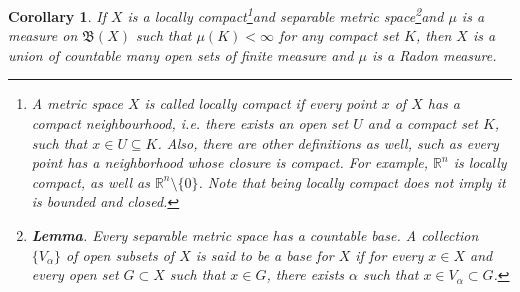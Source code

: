 \documentclass[11pt]{book}
\newtheorem{corollary}{Corollary}[theorem]
\theoremstyle{definition}
\numberwithin{equation}{chapter}
\begin{document}
\begin{corollary}
If $X$ is a locally compact\footnote{A metric space $X$ is called {\em locally compact} if every point $x$ of $X$ has a compact neighbourhood, i.e. there exists an open set $U$ and a compact set $K$, such that $x\in U \subseteq K$. Also, there are other definitions as well, such as every point has a neighborhood whose closure is compact. For example, $\mathbb{R}^n$ is locally compact, as well as $\mathbb{R}^n \setminus \{0\}$. Note that being locally compact does not imply it is bounded and closed.}and separable metric space\footnote{{\bf Lemma}. Every separable metric space has a countable base\cite{10}. A collection $\{V_\alpha\}$ of open subsets of $X$ is said to be a {\em base} for $X$ if for every $x\in X$ and every open set $G \subset X$ such that $x \in G$, there exists $\alpha$ such that $x \in V_\alpha \subset G$.}and $\mu$ is a measure on $\mathfrak{B}(X)$ such that $\mu(K) < \infty$ for any compact set $K$, then $X$ is a union of countable many open sets of finite measure and $\mu$ is a Radon measure.
\end{corollary}
\end{document}
